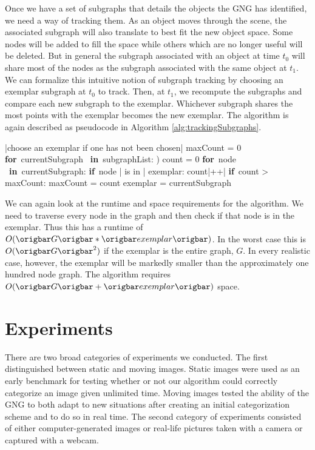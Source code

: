 \documentclass{article}
\renewcommand{\|}{\origbar} %
\renewcommand{\FOR}{\mbox{{\bf for} }\tab}
\renewcommand{\IF}{\mbox{{\bf if} }\tab}
\newcommand{\IN}{\mbox{ {\bf in} }}
\begin{document}
Once we have a set of subgraphs that details the objects the GNG has identified, we need a way of tracking them. As an object moves through the scene, the associated subgraph will also translate to best fit the new object space. Some nodes will be added to fill the space while others which are no longer useful will be deleted. But in general the subgraph associated with an object at time $t_0$ will share most of the nodes as the subgraph associated with the same object at $t_1$. We can formalize this intuitive notion of subgraph tracking by choosing an exemplar subgraph at $t_0$ to track. Then, at $t_1$, we recompute the subgraphs and compare each new subgraph to the exemplar. Whichever subgraph shares the most points with the exemplar becomes the new exemplar. The algorithm is again described as pseudocode in Algorithm \ref{alg:trackingSubgraphs}.

\begin{Algorithm}[h!]
\begin{program}
  |choose an exemplar if one has not been chosen|
  maxCount = 0
  \FOR currentSubgraph \IN subgraphList: )
    count = 0
    \FOR node \IN currentSubgraph:
      \IF node | is in | exemplar:
        count|++| \untab \untab
    \IF count > maxCount:
      maxCount = count
      exemplar = currentSubgraph
\end{program}
\caption{Pseudocode for Tracking Subgraphs}
\label{alg:trackingSubgraphs}
\end{Algorithm}

We can again look at the runtime and space requirements for the algorithm. We need to traverse every node in the graph and then check if that node is in the exemplar. Thus this has a runtime of $O(\|G\|*\|exemplar\|)$. In the worst case this is $O(\|G\|^2)$ if the exemplar is the entire graph, $G$. In every realistic case, however, the exemplar will be markedly smaller than the approximately one hundred node graph. The algorithm requires $O(\|G\|+\|exemplar\|)$ space.

\section{Experiments}
\label{sec:experiments}


There are two broad categories of experiments we conducted. The first distinguished between static and moving images. Static images were used as an early benchmark for testing whether or not our algorithm could correctly categorize an image given unlimited time. Moving images tested the ability of the GNG to both adapt to new situations after creating an initial categorization scheme and to do so in real time. The second category of experiments consisted of either computer-generated images or real-life pictures taken with a camera or captured with a webcam. 
\end{document}
